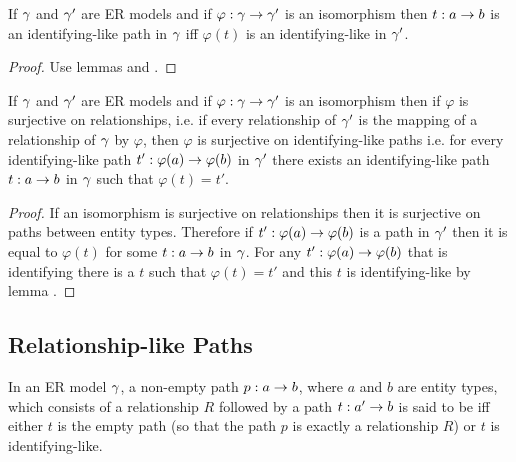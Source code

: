 \begin{lemma}
If $\gamma$ and $\gamma'$ are ER models and if $\varphi:\gamma \rightarrow \gamma'$ is an isomorphism then $t: a  \rightarrow  b$ is an identifying-like path in $\gamma$ iff $\varphi(t)$ is an identifying-like in $\gamma'$.
\end{lemma}
\begin{proof}
Use lemmas  and .
\end{proof}

\begin{lemma}
If $\gamma$ and $\gamma'$ are ER models and if $\varphi:\gamma \rightarrow \gamma'$ is an isomorphism then if $\varphi$ is 
surjective on relationships, i.e. if every relationship of $\gamma'$ is the mapping of a relationship of $\gamma$ by  $\varphi$,
then $\varphi$ is surjective on identifying-like paths i.e. for every identifying-like path $t': \varphi(a) \rightarrow \varphi(b)$
in $\gamma'$ there exists an identifying-like path $t: a \rightarrow b$ in $\gamma$ such that $\varphi(t)=t'$. 
\end{lemma}
\begin{proof}
If an isomorphism is surjective on relationships then it is surjective on paths between entity types.
Therefore if $t':\varphi(a) \rightarrow \varphi(b)$ is a path in $\gamma'$ then it is equal to $\varphi(t)$ for some
$t: a \rightarrow b$ in $\gamma$. For any $t':\varphi(a) \rightarrow \varphi(b)$ that is identifying there is a $t$ such that 
$\varphi(t)=t'$ and this $t$ is identifying-like by lemma .  
\end{proof}
\subsection{Relationship-like Paths}
\begin{definition}
In an ER model $\gamma$, a non-empty path $p: a \rightarrow b$, where $a$ and $b$ are entity types, which consists
of a relationship $R$ followed by a  path $t :a' \rightarrow b$ is said to be  iff
either  $t$ is the empty path (so that the path $p$ is exactly a relationship $R$) or $t$
is identifying-like.
\end{definition}

